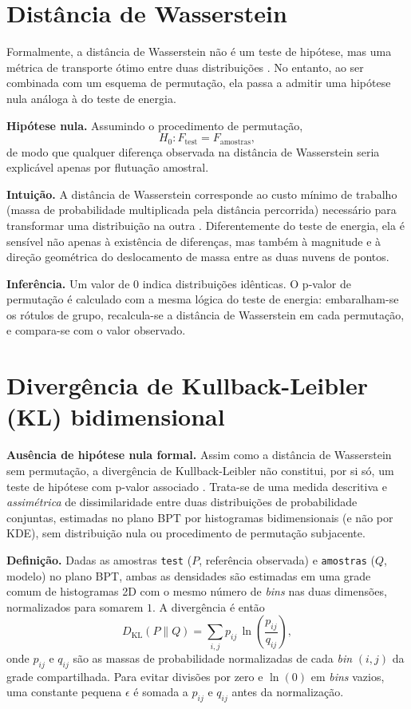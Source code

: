 \documentclass[11pt,a4paper]{article}
\begin{document}
\section{Distância de Wasserstein}

Formalmente, a distância de Wasserstein não é um teste de hipótese, mas
uma métrica de transporte ótimo entre duas distribuições
\cite{villani2009,rubner2000}. No entanto, ao ser combinada com um
esquema de permutação, ela passa a admitir uma hipótese nula análoga à
do teste de energia.

\textbf{Hipótese nula.} Assumindo o procedimento de permutação,
\[
H_0: F_{\text{test}} = F_{\text{amostras}},
\]
de modo que qualquer diferença observada na distância de Wasserstein
seria explicável apenas por flutuação amostral.

\textbf{Intuição.} A distância de Wasserstein corresponde ao custo
mínimo de trabalho (massa de probabilidade multiplicada pela distância
percorrida) necessário para transformar uma distribuição na outra
\cite{kantorovich1942,villani2009}. Diferentemente do teste de energia,
ela é sensível não apenas à existência de diferenças, mas também à
magnitude e à direção geométrica do deslocamento de massa entre as duas
nuvens de pontos.

\textbf{Inferência.} Um valor de $0$ indica distribuições idênticas. O
p-valor de permutação é calculado com a mesma lógica do teste de
energia: embaralham-se os rótulos de grupo, recalcula-se a distância de
Wasserstein em cada permutação, e compara-se com o valor observado.

\section{Divergência de Kullback-Leibler (KL) bidimensional}

\textbf{Ausência de hipótese nula formal.} Assim como a distância de
Wasserstein sem permutação, a divergência de Kullback-Leibler não
constitui, por si só, um teste de hipótese com p-valor associado
\cite{kullback1951}. Trata-se de uma medida descritiva e
\emph{assimétrica} de dissimilaridade entre duas distribuições de
probabilidade conjuntas, estimadas no plano BPT por histogramas
bidimensionais (e não por KDE), sem distribuição nula ou procedimento de
permutação subjacente.

\textbf{Definição.} Dadas as amostras \texttt{test} ($P$, referência
observada) e \texttt{amostras} ($Q$, modelo) no plano BPT, ambas as
densidades são estimadas em uma grade comum de histogramas 2D com o
mesmo número de \textit{bins} nas duas dimensões, normalizados para
somarem $1$. A divergência é então
\[
D_{\mathrm{KL}}(P \parallel Q) = \sum_{i,j} p_{ij} \,
\ln\!\left(\frac{p_{ij}}{q_{ij}}\right),
\]
onde $p_{ij}$ e $q_{ij}$ são as massas de probabilidade normalizadas de
cada \textit{bin} $(i,j)$ da grade compartilhada. Para evitar divisões por
zero e $\ln(0)$ em \textit{bins} vazios, uma constante pequena $\epsilon$
é somada a $p_{ij}$ e $q_{ij}$ antes da normalização.
\end{document}
